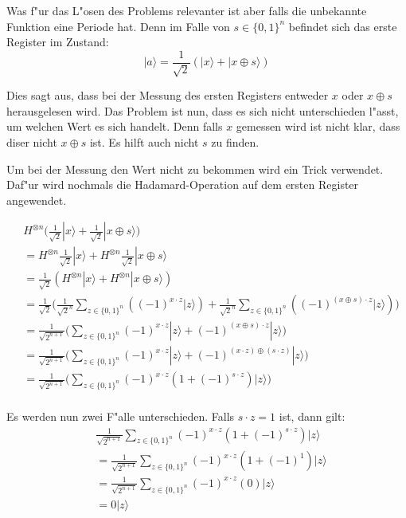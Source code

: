 \begin{refsection}
Was f"ur das L"osen des Problems relevanter ist aber falls die unbekannte
Funktion eine Periode hat. Denn im Falle von $s \in \{0,1\}^n$ befindet sich
das erste Register im Zustand:
\[
    |a\rangle = \frac{1}{\sqrt{2}} ( |x\rangle + |x \oplus s \rangle )
\]

Dies sagt aus, dass bei der Messung des ersten Registers entweder $x$ oder $x
\oplus s$ herausgelesen wird. Das Problem ist nun, dass es sich nicht
unterschieden l"asst, um welchen Wert es sich handelt. Denn falls $x$ gemessen
wird ist nicht klar, dass diser nicht $x \oplus s$ ist. Es hilft auch nicht
$s$ zu finden.

Um bei der Messung den Wert nicht zu bekommen wird ein Trick verwendet. Daf"ur
wird nochmals die Hadamard-Operation auf dem ersten Register angewendet.

\begin{align*}
    &H^{ \otimes n } \biggl( 
                     \frac{1}{\sqrt{2}} |x\rangle + 
                     \frac{1}{\sqrt{2}} |x \oplus s\rangle 
                     \biggr)
    \\
    &= H^{ \otimes n } \frac{1}{\sqrt{2}} |x\rangle + 
       H^{ \otimes n } \frac{1}{\sqrt{2}} |x \oplus s\rangle 
    \\ 
    &= \frac1{\sqrt{2}} ( H^{ \otimes n } |x\rangle + H^{ \otimes n } |x \oplus s\rangle )
    \\
    &= \frac1{\sqrt{2}}
       \biggl( \frac1{\sqrt{2}^n} \sum_{z \in \{0,1\}^n} {( (-1)^{x \cdot z} |z\rangle )} + 
               \frac1{\sqrt{2}^n}  \sum_{z \in \{0,1\}^n} { ( (-1)^{(x \oplus s) \cdot z } |z\rangle)}
       \biggr)
    \\
    &= \frac1{\sqrt{2^{n + 1}}}
       \biggl( \sum_{z \in \{0,1\}^n}  { 
                   (-1)^{x \cdot z} |z\rangle + (-1)^{(x \oplus s) \cdot z } |z\rangle 
               } 
       \biggr)
    \\
    &= \frac1{\sqrt{2^{n + 1}}}
       \biggl( \sum_{z \in \{0,1\}^n}  { 
                  (-1)^{x \cdot z} |z\rangle + (-1)^{(x \cdot z) \oplus ( s \cdot z) } |z\rangle 
               } 
       \biggr)
    \\
    &= \frac1{\sqrt{2^{n + 1}}}
       \biggl( 
          \sum_{z \in \{0,1\}^n}  { (-1)^{x \cdot z} ( 1 + (-1)^{ s \cdot z}) |z\rangle } 
       \biggr)
    \\
\end{align*}

Es werden nun zwei F"alle unterschieden. Falls $s \cdot z = 1$ ist, dann gilt:
\begin{align*}
    &\frac1{\sqrt{2^{n + 1}}}
      \sum_{z \in \{0,1\}^n}  { (-1)^{x \cdot z} ( 1 + (-1)^{ s \cdot z}) |z\rangle } 
    \\
    &= 
    \frac1{\sqrt{2^{n + 1}}}
      \sum_{z \in \{0,1\}^n}  { (-1)^{x \cdot z} ( 1 + (-1)^1) |z\rangle } 
    \\
    &= 
    \frac1{\sqrt{2^{n + 1}}}
      \sum_{z \in \{0,1\}^n}  { (-1)^{x \cdot z} (0) |z\rangle } 
    \\
    &=
    0 |z\rangle
\end{align*}


\end{refsection}

